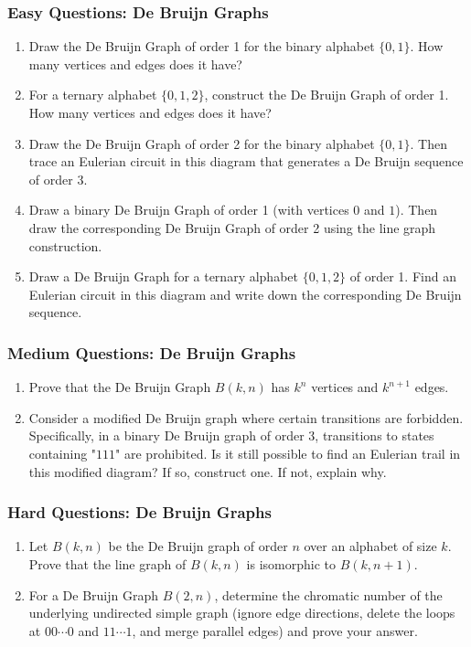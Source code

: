 \documentclass{article}
\theoremstyle{definition}
\begin{document}
\subsubsection{Easy Questions: De Bruijn Graphs}
\begin{enumerate}[resume]
    \item Draw the De Bruijn Graph of order 1 for the binary alphabet $\{0,1\}$. How many vertices and edges does it have?
    
    \item For a ternary alphabet $\{0,1,2\}$, construct the De Bruijn Graph of order 1. How many vertices and edges does it have?
    \item Draw the De Bruijn Graph of order 2 for the binary alphabet $\{0,1\}$. Then trace an Eulerian circuit in this diagram that generates a De Bruijn sequence of order 3.
    
    \item Draw a binary De Bruijn Graph of order 1 (with vertices $0$ and $1$). Then draw the corresponding De Bruijn Graph of order 2 using the line graph construction.
    
    \item Draw a De Bruijn Graph for a ternary alphabet $\{0,1,2\}$ of order 1. Find an Eulerian circuit in this diagram and write down the corresponding De Bruijn sequence.
\end{enumerate}

\subsubsection{Medium Questions: De Bruijn Graphs}
\begin{enumerate}[resume]
    \item Prove that the De Bruijn Graph $B(k,n)$ has $k^n$ vertices and $k^{n+1}$ edges.
    
    \item Consider a modified De Bruijn graph where certain transitions are forbidden. Specifically, in a binary De Bruijn graph of order 3, transitions to states containing "$111$" are prohibited. Is it still possible to find an Eulerian trail in this modified diagram? If so, construct one. If not, explain why.
\end{enumerate}

\subsubsection{Hard Questions: De Bruijn Graphs}
\begin{enumerate}[resume]
    \item Let $B(k,n)$ be the De Bruijn graph of order $n$ over an alphabet of size $k$. Prove that the line graph of $B(k,n)$ is isomorphic to $B(k,n+1)$.
    
    \item For a De Bruijn Graph $B(2,n)$, determine the chromatic number of the underlying undirected simple graph (ignore edge directions, delete the loops at $00\cdots0$ and $11\cdots1$, and merge parallel edges) and prove your answer.
\end{enumerate}
\end{document}
